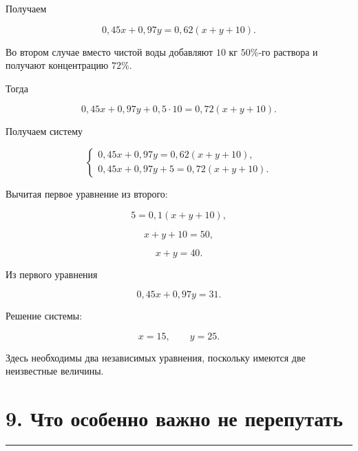 \documentclass[a4paper,12pt]{article}
\newcommand{\checksection}[1]{%
  \section*{\color{darkaccent}#1}
  \vspace{-0.6em}
  {\color{accent!70}\rule{\linewidth}{0.6pt}}
  \vspace{0.35em}
}
\begin{document}
Получаем

\[
0{,}45x+0{,}97y
=
0{,}62(x+y+10).
\tag{1}
\]

Во втором случае вместо чистой воды добавляют \(10\) кг \(50\%\)-го раствора и получают концентрацию \(72\%\).

Тогда

\[
0{,}45x+0{,}97y+0{,}5\cdot10
=
0{,}72(x+y+10).
\tag{2}
\]

Получаем систему

\[
\begin{cases}
0{,}45x+0{,}97y
=
0{,}62(x+y+10),\\[1mm]
0{,}45x+0{,}97y+5
=
0{,}72(x+y+10).
\end{cases}
\]

Вычитая первое уравнение из второго:

\[
5=0{,}1(x+y+10),
\]

\[
x+y+10=50,
\]

\[
x+y=40.
\]

Из первого уравнения

\[
0{,}45x+0{,}97y=31.
\]

Решение системы:

\[
\boxed{x=15,\qquad y=25}.
\]

Здесь необходимы два независимых уравнения, поскольку имеются две неизвестные величины.


\checksection{9. Что особенно важно не перепутать}
\end{document}
